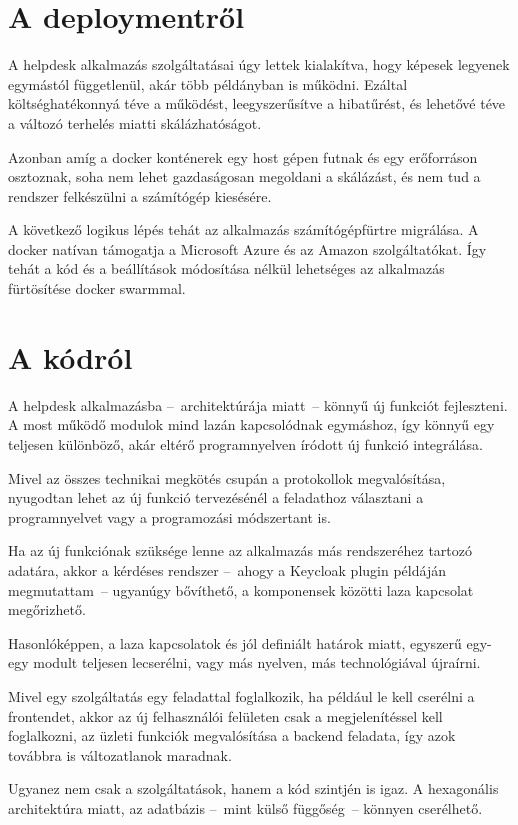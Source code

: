 \section{A deploymentről}

A helpdesk alkalmazás szolgáltatásai úgy lettek kialakítva, hogy képesek legyenek egymástól függetlenül, akár több példányban is működni. Ezáltal költséghatékonnyá téve a működést, leegyszerűsítve a hibatűrést, és lehetővé téve a változó terhelés miatti skálázhatóságot.

Azonban amíg a docker konténerek egy host gépen futnak és egy erőforráson osztoznak, soha nem lehet gazdaságosan megoldani a skálázást, és nem tud a rendszer felkészülni a számítógép kiesésére.

A következő logikus lépés tehát az alkalmazás számítógépfürtre migrálása. A docker natívan támogatja a Microsoft Azure és az Amazon \cite{docker_website_deploy_ECS} szolgáltatókat. Így tehát a kód és a beállítások módosítása nélkül lehetséges az alkalmazás fürtösítése docker swarmmal.

\bigskip
\section{A kódról}
A helpdesk alkalmazásba --~architektúrája miatt~-- könnyű új funkciót fejleszteni. A most működő modulok mind lazán kapcsolódnak egymáshoz, így könnyű egy teljesen különböző, akár eltérő programnyelven íródott új funkció integrálása.

Mivel az összes technikai megkötés csupán a protokollok megvalósítása, nyugodtan lehet az új funkció tervezésénél a feladathoz választani a programnyelvet vagy a programozási módszertant is. 

Ha az új funkciónak szüksége lenne az alkalmazás más rendszeréhez tartozó adatára, akkor a kérdéses rendszer --~ahogy a Keycloak plugin példáján megmutattam~--   ugyanúgy bővíthető, a komponensek közötti laza kapcsolat megőrizhető.

Hasonlóképpen, a laza kapcsolatok és jól definiált határok miatt, egyszerű egy-egy modult teljesen lecserélni, vagy más nyelven, más technológiával újraírni.

Mivel egy szolgáltatás egy feladattal foglalkozik, ha például le	 kell cserélni a frontendet, akkor az új felhasználói felületen csak a megjelenítéssel kell foglalkozni, az üzleti funkciók megvalósítása a backend feladata, így azok továbbra is változatlanok maradnak.

Ugyanez nem csak a szolgáltatások, hanem a kód szintjén is igaz. A hexagonális architektúra miatt, az adatbázis --~mint külső függőség~--   könnyen cserélhető. 

